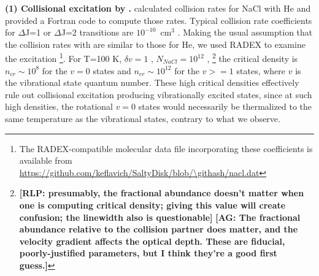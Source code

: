 \documentclass[twocolumn]{aastex62}
\newcommand{\rlp}[1]{\textcolor{blue!65!black}{\textbf{[RLP: #1]}}}
\newcommand{\ag}[1]{\textcolor{red!65!black}{\textbf{[AG: #1]}}}
\begin{document}
\par{\textbf{(1) Collisional excitation by \hh.}} 
%
%
\citet{Quintana-Lacaci2016a} calculated collision rates for NaCl with He and
provided a Fortran code to compute those rates.  Typical collision rate coefficients for
\hbox{$\Delta$J=1} or \hbox{$\Delta$J=2} transitions are $10^{-10}$~cm$^3$ \pers.  Making the usual
assumption that the collision rates with \hh are similar to those for He, we used
RADEX \citep{van-der-Tak2007a} to examine the excitation \footnote{The
RADEX-compatible molecular data
file incorporating these coefficients is available from
\url{https://github.com/keflavich/SaltyDisk/blob/\githash/nacl.dat}}.
For T=100 K, $\delta v=1$ \kms \perpc, $N_{NaCl}=10^{12}$ \persc,
\footnote{\rlp{presumably,
the fractional abundance doesn't matter when one is computing critical density;
giving this value will create confusion; the linewidth also is questionable}
\ag{The fractional abundance relative to the collision partner does matter,
and the velocity gradient affects the optical depth.  These are fiducial,
poorly-justified parameters, but I think they're a good first guess.}
}
the critical density is $n_{cr}\sim10^8$ \percc for the $v=0$
states and $n_{cr}\sim10^{12}$ for the $v>=1$ states, where $v$ is the
vibrational state quantum number.  These high critical densities effectively
rule out collisional excitation producing vibrationally excited states,
since at such high densities, the rotational $v=0$ states would necessarily
be thermalized to the same temperature as the vibrational states, contrary
to what we observe.
\end{document}
